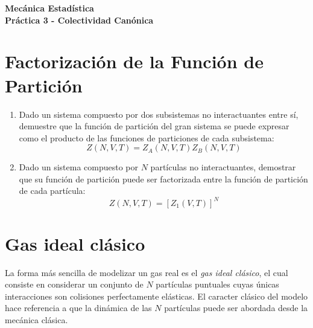 \documentclass[a4paper,11pt]{article}
\begin{document}
\pagestyle{fancy}
\chead{\small \the\year}



\thispagestyle{plain}
\begin{center}
    \textbf{\large
        Mecánica Estadística \\
        Práctica 3 - Colectividad Canónica
    }
\end{center}
\vspace{-1.5em}




\section{Factorización de la Función de Partición}

\begin{enumerate}[label=(\alph*),
                  leftmargin=2\parindent,
                  rightmargin=2\parindent]

    \item{Dado un sistema compuesto por dos subsistemas no interactuantes entre sí,
          demuestre que la función de partición del gran sistema se puede expresar
          como el producto de las funciones de particiones de cada subsistema:
          $$ Z(N, V, T) = Z_A(N, V, T) Z_B(N, V, T) $$
          }

    \item{Dado un sistema compuesto por $N$ partículas no interactuantes, demostrar que
          su función de partición puede ser factorizada entre la función de partición
          de cada partícula:
          $$ Z(N, V, T) = [Z_1(V, T)]^N $$
          }

\end{enumerate}


\section{Gas ideal clásico}
\label{sec:gas-ideal}

La forma más sencilla de modelizar un gas real es el \emph{gas ideal
clásico}, el cual consiste en considerar un conjunto de $N$ partículas
puntuales cuyas únicas interacciones son colisiones
perfectamente elásticas.
El caracter clásico del modelo hace referencia a que la dinámica de
las $N$ partículas puede ser abordada desde la mecánica clásica.
\end{document}
